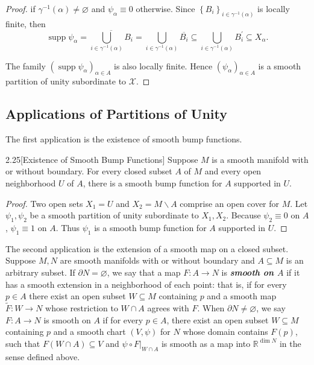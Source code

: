 \begin{proof}
    if \( \gamma^{-1}(\alpha) \ne \varnothing \) and \( \psi_{\alpha} \equiv 0 \) otherwise. Since \( {\left\{ B_{i} \right\}}_{i \in \gamma^{-1}(\alpha)} \) is locally finite, then
    \[
        \operatorname{supp} \psi_{\alpha} = \overline{ \bigcup_{i \in \gamma^{-1}(\alpha)} B_{i} } = \bigcup_{i \in \gamma^{-1}(\alpha)} \overline{B_{i}} \subseteq \bigcup_{i \in \gamma^{-1}(\alpha)} B_{i}^{\prime} \subseteq X_{\alpha}.
    \]

    The family \( {(\operatorname{supp} \psi_{\alpha})}_{\alpha \in A} \) is also locally finite. Hence \( {(\psi_{\alpha})}_{\alpha \in A} \) is a smooth partition of unity subordinate to \( \mathcal{X} \).
\end{proof}

\subsection{Applications of Partitions of Unity}

The first application is the existence of smooth bump functions.

\begin{prop}{2.25}[Existence of Smooth Bump Functions]
    Suppose \( M \) is a smooth manifold with or without boundary. For every closed subset \( A \) of \( M \) and every open neighborhood \( U \) of \( A \), there is a smooth bump function for \( A \) supported in \( U \).
\end{prop}

\begin{proof}
    Two open sets \( X_{1} =  U \) and \( X_{2} = M \smallsetminus A \) comprise an open cover for \( M \). Let \( \psi_{1}, \psi_{2} \) be a smooth partition of unity subordinate to \( X_{1}, X_{2} \). Because \( \psi_{2} \equiv 0 \) on \( A \), \( \psi_{1} \equiv 1 \) on \( A \). Thus \( \psi_{1} \) is a smooth bump function for \( A \) supported in \( U \).
\end{proof}

The second application is the extension of a smooth map on a closed subset. Suppose \( M, N \) are smooth manifolds with or without boundary and \( A \subseteq M \) is an arbitrary subset. If \( \partial N = \varnothing \), we say that a map \( F: A \to N \) is \emph{\textbf{smooth on \(A\)}} if it has a smooth extension in a neighborhood of each point: that is, if for every \( p \in A \) there exist an open subset \( W \subseteq M \) containing \( p \) and a smooth map \( \widetilde{F}: W \to N \) whose restriction to \( W \cap A \) agrees with \( F \). When \( \partial N \ne \varnothing \), we say \( F: A \to N \) is smooth on \( A \) if for every \( p \in A \), there exist an open subset \( W \subseteq M \) containing \( p \) and a smooth chart \( (V, \psi) \) for \( N \) whose domain contains \( F(p) \), such that \( F(W \cap A) \subseteq V \) and \( \psi \circ F\vert_{W \cap A} \) is smooth as a map into \( \mathbb{R}^{\dim N} \) in the sense defined above.

